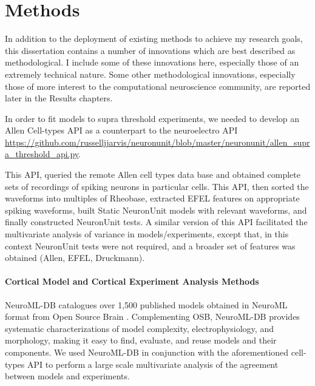 \chapter{Methods}
In addition to the deployment of existing methods to achieve my research goals, this dissertation contains a number of innovations which are best described as methodological.  I include some of these innovations here, especially those of an extremely technical nature.  Some other methodological innovations, especially those of more interest to the computational neuroscience community, are reported later in the Results chapters.







In order to fit models to supra threshold experiments, we needed to develop an Allen Cell-types API as a counterpart to the neuroelectro API \newline \url{https://github.com/russelljjarvis/neuronunit/blob/master/neuronunit/allen_supra_threshold_api.py}.


\newline
This API, queried the remote Allen cell types data base and obtained complete sets of recordings of spiking neurons in particular cells. This API, then sorted the waveforms into multiples of Rheobase, extracted EFEL features on appropriate spiking waveforms, built Static NeuronUnit models with relevant waveforms, and finally constructed NeuronUnit tests. A similar version of this API facilitated the multivariate analysis of variance in models/experiments, except that, in this context NeuronUnit tests were not required, and a broader set of features was obtained (Allen, EFEL, Druckmann).
\subsubsection{Cortical Model and Cortical Experiment Analysis Methods}
NeuroML-DB \cite{birgiolas2016rapid} catalogues over 1,500 published models obtained in NeuroML format from Open Source Brain \cite{gleeson2019open}. Complementing OSB, NeuroML-DB provides systematic characterizations of model complexity, electrophysiology, and morphology, making it easy to find, evaluate, and reuse models and their components. We used NeuroML-DB in conjunction with the aforementioned cell-types API to perform a large scale multivariate analysis of the agreement between models and experiments.

